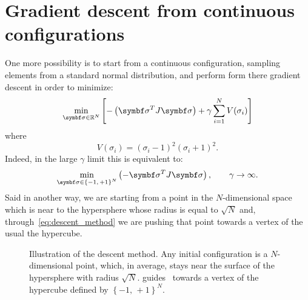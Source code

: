 \documentclass[\rootdir/main.tex]{subfiles}
\begin{document}
\section{Gradient descent from continuous configurations}
One more possibility is to start from a continuous configuration, \eg sampling elements from a standard normal distribution, and perform form there gradient descent in order to minimize:
\begin{equation}\label{eq:descent_method}
    \min_{\bsigma \in \mathbb{R}^N} \left[ - \left(\bsigma^T  J  \bsigma\right) + \gamma \sum_{i = 1}^{N} V(\sigma_i) \right]
\end{equation} 
where
\begin{equation}
    V(\sigma_i) = \left(\sigma_i - 1\right)^2 \left(\sigma_i + 1\right)^2. 
\end{equation}
Indeed, in the large $\gamma$ limit this is equivalent to:
\begin{equation}
    \min_{\bsigma \in \left\{-1, \, +1\right\}^N}  \left( - \bsigma^T J  \bsigma\right), \qquad \gamma \to \infty.
\end{equation}
Said in another way, we are starting from a point in the $N$-dimensional space which is near to the hypersphere whose radius is equal to $\sqrt{N}$ and, through~\cref{eq:descent_method} we are pushing that point towards a vertex of the usual the hypercube.
\begin{figure}[hbt]
    \centering
    
    \caption{Illustration of the descent method. Any initial configuration \bsigma is a $N$-dimensional point, which, in average, stays near the surface of the hypersphere with radius $\sqrt{N}$.  guides \bsigma\ towards a vertex of the hypercube defined by $\left\{-1,\, + 1\right\}^N$.}
    \label{fig:descent_method}
\end{figure}
\end{document}
